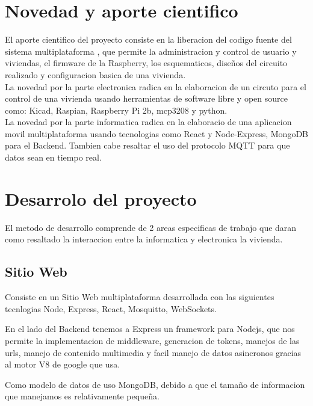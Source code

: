\documentclass[letterpaper,12pt]{article}
\begin{document}
{		\section{Novedad y aporte cientifico}
		
		El aporte cientifico del proyecto consiste en la liberacion del codigo fuente del sistema multiplataforma , que permite la administracion y control de usuario y viviendas,  el firmware de la  Raspberry, los esquematicos, diseños del circuito realizado y configuracion basica de una vivienda.\\
		
		La novedad por la parte electronica radica en la elaboracion de un circuto para el control de una vivienda usando herramientas de software libre y open source como: Kicad, Raspian, Raspberry Pi 2b, mcp3208 y python.\\
		
		La novedad por la parte informatica radica en la elaboracio de una aplicacion movil multiplataforma usando tecnologias como React  y Node-Express, MongoDB para el Backend. Tambien cabe resaltar el uso  del protocolo MQTT para que datos sean en tiempo real.
		
		
		
		
		\section{Desarrolo del proyecto}
		El metodo de desarrollo comprende de 2 areas especificas de trabajo que daran como resaltado la interaccion entre la informatica y electronica la vivienda.

		
		\subsection{Sitio Web}
		
		Consiste en un Sitio Web multiplataforma desarrollada con las siguientes tecnlogias Node, Express, React, Mosquitto, WebSockets.
		
		En el lado del Backend tenemos a Express  un framework para Nodejs, que nos permite la implementacion de middleware, generacion de tokens, manejos de las urls, manejo de contenido multimedia y facil manejo de datos asincronos gracias al motor V8 de google que usa.
		
		Como modelo de datos de uso MongoDB, debido a que el tamaño de informacion que manejamos es relativamente pequeña.
		
}
\end{document}
